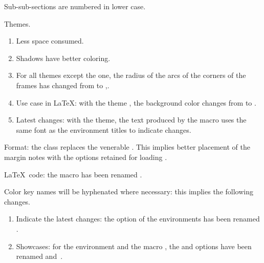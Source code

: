 \begin{tdocupdate}
	\item Sub-sub-sections are numbered in lower case.

	\item Themes.
	\begin{enumerate}
		\item Less space consumed.

		\item Shadows have better coloring.

		\item For all themes except the  one, the radius of the arcs of the corners of the frames has changed from \tdoclatexin{.75mm} to \tdoclatexin{.2pt},.

 		\item Use case in \LaTeX: with the theme , the background color changes from  to .

		\item Latest changes: with the  theme, the \tdoclatexin{[Init]} text produced by the  macro uses the same font as the environment titles to indicate changes.
	\end{enumerate}
\end{tdocupdate}

\tdocsep




\begin{tdocbreak}[version = 1.7.0, date = 2024-12-04]
	\item Format: the  class replaces the venerable . This implies better placement of the margin notes with the options retained for loading .

	\item \LaTeX\ code: the macro  has been renamed .

	\item Color key names will be hyphenated where necessary: this implies the following changes.
	\begin{enumerate}
		\item Indicate the latest changes: the  option of the environments has been renamed .

		\item Showcases: for the environment  and the macro , the  and   options have been renamed  and \,.
	\end{enumerate}
\end{tdocbreak}


